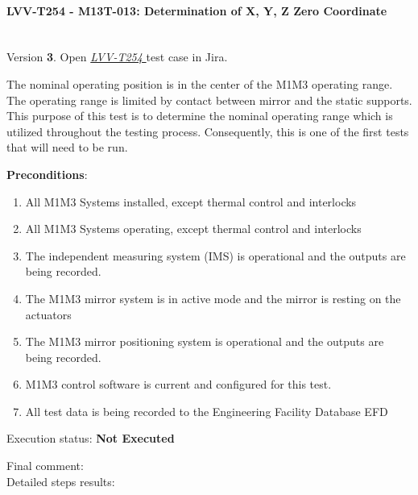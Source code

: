 \documentclass[SE,lsstdraft,STR,toc]{lsstdoc}
\providecommand{\tightlist}{
  \setlength{\itemsep}{0pt}\setlength{\parskip}{0pt}}
\begin{document}
\paragraph{ LVV-T254 - M13T-013: Determination of X, Y, Z Zero Coordinate }\mbox{}\\

Version \textbf{3}.
Open  \href{https://jira.lsstcorp.org/secure/Tests.jspa#/testCase/LVV-T254}{\textit{ LVV-T254 } }
test case in Jira.

The nominal operating position is in the center of the M1M3 operating
range. The operating range is limited by contact between mirror and the
static supports. This purpose of this test is to determine the nominal
operating range which is utilized throughout the testing process.
Consequently, this is one of the first tests that will need to be run.~

\textbf{ Preconditions}:\\
\begin{enumerate}
\tightlist
\item
  All M1M3 Systems installed, except thermal control and interlocks
\item
  All M1M3 Systems operating, except thermal control and interlocks
\item
  The independent measuring system (IMS) is operational and the outputs
  are being recorded.
\item
  The M1M3 mirror system is in active mode and the mirror is resting on
  the actuators
\item
  The M1M3 mirror positioning system is operational and the outputs are
  being recorded.
\item
  M1M3 control software is current and configured for this test.
\item
  All test data is being recorded to the Engineering Facility Database
  EFD
\end{enumerate}

Execution status: {\bf Not Executed }

Final comment:\\


Detailed steps results:
\end{document}
